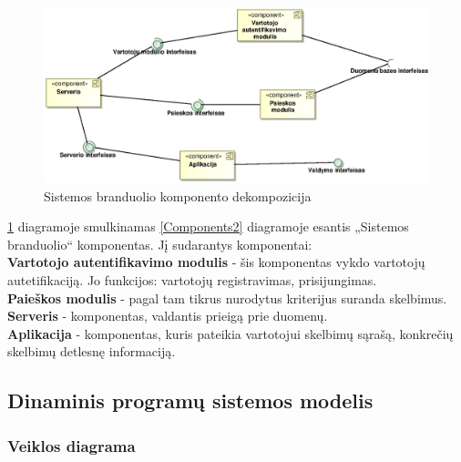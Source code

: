 \documentclass[12pt]{article}
\begin{document}
	\begin{figure}[h]
		\begin{center}
			\includegraphics[width=\textwidth]{Komponentai3.eps}
			\caption{Sistemos branduolio komponento dekompozicija\label{Components3}}
		\end{center}
	\end{figure}

	\ref{Components3} diagramoje smulkinamas \ref{Components2} diagramoje esantis „Sistemos branduolio“ komponentas. Jį sudarantys komponentai:\\
	
	\textbf{Vartotojo autentifikavimo modulis} - šis komponentas vykdo vartotojų autetifikaciją. Jo funkcijos: vartotojų registravimas, prisijungimas.\\
	
	\textbf{Paieškos modulis} - pagal tam tikrus nurodytus kriterijus suranda skelbimus.\\
	
	\textbf{Serveris} - komponentas, valdantis prieigą prie duomenų.\\
	
	\textbf{Aplikacija} - komponentas, kuris pateikia vartotojui skelbimų sąrašą, konkrečių skelbimų detlesnę informaciją.
	\pagebreak

	\subsection{Dinaminis programų sistemos modelis}
	\subsubsection{Veiklos diagrama}
	
\end{document}
